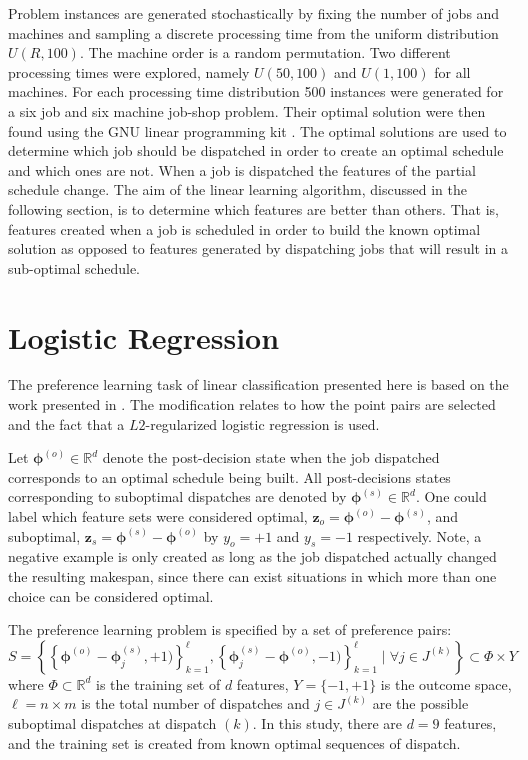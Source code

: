 \documentclass[10pt]{llncs}
\renewcommand{\vec}[1]{{\mbox{\boldmath$#1$}}}
\renewcommand{\vec}[1]{{\mathbf #1}}
\begin{document}
Problem instances are generated stochastically by fixing the number of jobs and machines and sampling a discrete processing time from the uniform distribution $U(R,100)$. The machine order is a random permutation. Two different processing times were explored, namely $U(50,100)$ and $U(1,100)$ for all machines. For each processing time distribution 500 instances were generated for a six job and six machine job-shop problem. Their optimal solution were then found using the GNU linear programming kit \cite{GLPK}. 
The optimal solutions are used to determine which job should be dispatched in order to create an optimal schedule and which ones are not. When a job is dispatched the features of the partial schedule change. The aim of the linear learning algorithm, discussed in the following section, is to determine which features are better than others. That is, features created when a job is scheduled in order to build the known optimal solution as opposed to features generated by dispatching jobs that will result in a sub-optimal schedule.



\section{Logistic Regression}\label{sec:Ordinal}

The preference learning task of linear classification presented here is based on the work presented in \cite{liblinear,newtontrustregion}. The modification relates to how the point pairs are selected and the fact that a $L2$-regularized logistic regression is used. 

Let $\vec{\phi}^{(o)}\in\mathbb{R}^d$ denote the post-decision state when the job dispatched corresponds to an optimal schedule being built. All post-decisions states corresponding to suboptimal dispatches are denoted by $\vec{\phi}^{(s)}\in\mathbb{R}^d$. One could label which feature sets were considered optimal, $\vec{z}_o=\vec{\phi}^{(o)}-\vec{\phi}^{(s)}$, and suboptimal, $\vec{z}_s=\vec{\phi}^{(s)}-\vec{\phi}^{(o)}$ by $y_o=+1$ and $y_s=-1$ respectively. 
Note, a negative example is only created as long as the job dispatched actually changed the resulting makespan, since there can exist situations in which more than one choice can be considered optimal.

The preference learning problem is specified by a set of preference pairs:
\begin{equation}
S = \left\{\left\{\vec{\phi}^{(o)}-\vec{\phi}^{(s)}_j,+1)\right\}_{k=1}^{\ell},\left\{\vec{\phi}^{(s)}_j-\vec{\phi}^{(o)},-1)\right\}_{k=1}^{\ell}
\;|\;\forall j\in J^{(k)}
\right\}\subset \Phi\times Y
\end{equation}
where $\Phi\subset \mathbb{R}^d$ is the training set of $d$ features, $Y=\{-1,+1\}$ is the outcome space, $\ell=n\times m$ is the total number of dispatches and $j\in J^{(k)}$ are the possible suboptimal dispatches at dispatch $(k)$. 
In this study, there are $d=9$ features, and the training set is created from known optimal sequences of dispatch.
\end{document}

